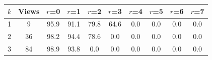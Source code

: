 \begin{tabular}{lccccccccc}
\toprule
$k$ & Views & $r$=0 & $r$=1 & $r$=2 & $r$=3 & $r$=4 & $r$=5 & $r$=6 & $r$=7 \\
\midrule
1 & 9 & 95.9 & 91.1 & 79.8 & 64.6 & 0.0 & 0.0 & 0.0 & 0.0 \\
2 & 36 & 98.2 & 94.4 & 78.6 & 0.0 & 0.0 & 0.0 & 0.0 & 0.0 \\
3 & 84 & 98.9 & 93.8 & 0.0 & 0.0 & 0.0 & 0.0 & 0.0 & 0.0 \\
\bottomrule
\end{tabular}